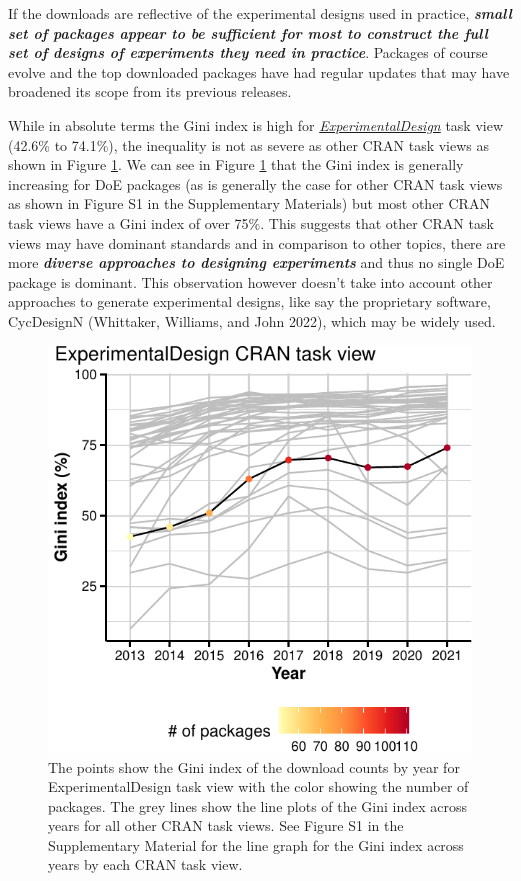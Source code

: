 \documentclass{article}
\begin{document}
If the downloads are reflective of the experimental designs used in
practice, \textbf{\emph{small set of packages appear to be sufficient
for most to construct the full set of designs of experiments they need
in practice}}. Packages of course evolve and the top downloaded packages
have had regular updates that may have broadened its scope from its
previous releases.

While in absolute terms the Gini index is high for
\href{http://CRAN.R-project.org/view=ExperimentalDesign}{\emph{ExperimentalDesign}}
task view (42.6\% to 74.1\%), the inequality is not as severe as other
CRAN task views as shown in Figure \ref{fig:fig-gini-all-ctvs}. We can
see in Figure \ref{fig:fig-gini-all-ctvs} that the Gini index is
generally increasing for DoE packages (as is generally the case for
other CRAN task views as shown in Figure S1 in the Supplementary
Materials) but most other CRAN task views have a Gini index of over
75\%. This suggests that other CRAN task views may have dominant
standards and in comparison to other topics, there are more
\textbf{\emph{diverse approaches to designing experiments}} and thus no
single DoE package is dominant. This observation however doesn't take
into account other approaches to generate experimental designs, like say
the proprietary software, CycDesignN (Whittaker, Williams, and John
2022), which may be widely used.

\begin{figure}[htbp]

{\centering \includegraphics{figures/fig-gini-all-ctvs-1} 

}

\caption{The points show the Gini index of the download counts by year for ExperimentalDesign task view with the color showing the number of packages. The grey lines show the line plots of the Gini index across years for all other CRAN task views. See Figure S1 in the Supplementary Material for the line graph for the Gini index across years by each CRAN task view.}\label{fig:fig-gini-all-ctvs}
\end{figure}
\end{document}
